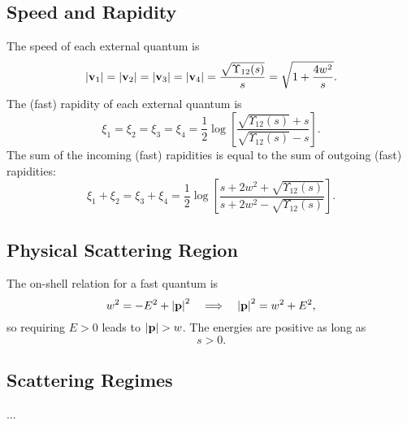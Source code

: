 \subsection{Speed and Rapidity}
The speed of each external quantum is
\begin{equation}
	\left\lvert \mathbf{v}_{1} \right\rvert = \left\lvert \mathbf{v}_{2} \right\rvert = \left\lvert \mathbf{v}_{3} \right\rvert = \left\lvert \mathbf{v}_{4} \right\rvert = \frac{\sqrt{\Upsilon_{12}(s)}}{s} = \sqrt{1 + \frac{4 w^{2}}{s}}.
\end{equation}
The (fast) rapidity of each external quantum is
\begin{equation}
	\xi_{1} = \xi_{2} = \xi_{3} = \xi_{4} = \frac{1}{2} \log{\left[ \frac{\sqrt{\Upsilon_{12}(s)} + s}{\sqrt{\Upsilon_{12}(s)} - s} \right]}.
\end{equation}
The sum of the incoming (fast) rapidities is equal to the sum of outgoing (fast) rapidities:
\begin{equation}
	\xi_{1} + \xi_{2} = \xi_{3} + \xi_{4} = \frac{1}{2} \log{\left[ \frac{s + 2w^{2} + \sqrt{\Upsilon_{12}(s)}}{s + 2w^{2} - \sqrt{\Upsilon_{12}(s)}} \right]}.
\end{equation}
\subsection{Physical Scattering Region}
The on-shell relation for a fast quantum is
\begin{equation}
	w^{2} = -E^{2} + \left\lvert \mathbf{p} \right\rvert^{2} \quad \Longrightarrow \quad \left\lvert \mathbf{p} \right\rvert^{2} = w^{2} + E^{2},
\end{equation}
so requiring $E > 0$ leads to $\left\lvert \mathbf{p} \right\rvert > w$. The energies are positive as long as
\begin{equation}
	s > 0.
\end{equation}
\subsection{Scattering Regimes}
...
